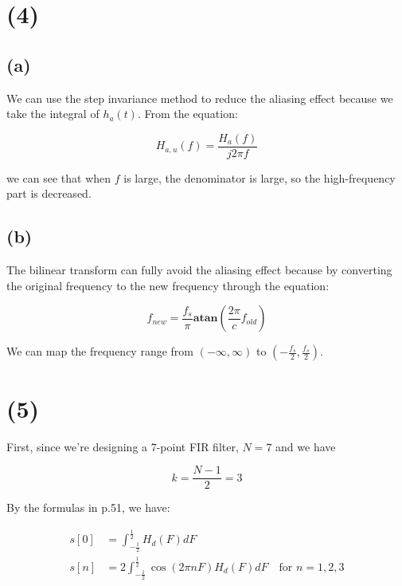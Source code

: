 \documentclass{article}
\begin{document}
\section*{(4)}

\subsection*{(a)}

We can use the step invariance method to reduce the aliasing effect because we take the integral of $h_a(t)$.
From the equation:

\begin{equation*}
    H_{a,u}(f) = \frac{H_a(f)}{j2\pi f}
\end{equation*}

we can see that when $f$ is large, the denominator is large, so the high-frequency part is decreased.

\subsection*{(b)}

The bilinear transform can fully avoid the aliasing effect because 
by converting the original frequency to the new frequency through the equation:

\begin{equation*}
    f_{new} = \frac{f_s}{\pi}\mathbf{atan}(\frac{2\pi}{c}f_{old})
\end{equation*}

We can map the frequency range from $(-\infty, \infty)$ to $(-\frac{f_s}{2}, \frac{f_s}{2})$.

\section*{(5)}

First, since we're designing a 7-point FIR filter, $N = 7$ and we have

\begin{equation*}
    k = \frac{N-1}{2} = 3
\end{equation*}

By the formulas in p.51, we have:

\begin{align*}
    s[0] &= \int^{\frac{1}{2}}_{-\frac{1}{2}} H_d(F) dF \\
    s[n] &= 2\int^{\frac{1}{2}}_{-\frac{1}{2}} \cos(2\pi nF) H_d(F) dF \quad \text{for } n = 1, 2, 3
\end{align*}
\end{document}
